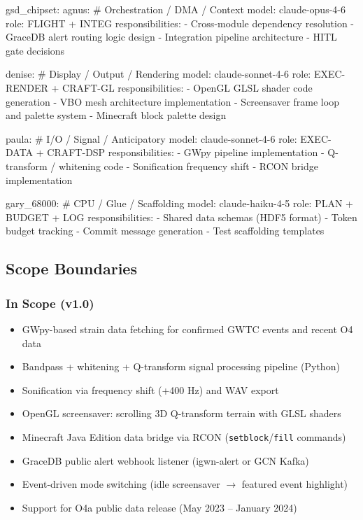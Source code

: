 \documentclass[11pt,letterpaper]{article}
\begin{document}
\begin{asciibox}
gsd_chipset:
  agnus:                        # Orchestration / DMA / Context
    model: claude-opus-4-6
    role: FLIGHT + INTEG
    responsibilities:
      - Cross-module dependency resolution
      - GraceDB alert routing logic design
      - Integration pipeline architecture
      - HITL gate decisions

  denise:                       # Display / Output / Rendering
    model: claude-sonnet-4-6
    role: EXEC-RENDER + CRAFT-GL
    responsibilities:
      - OpenGL GLSL shader code generation
      - VBO mesh architecture implementation
      - Screensaver frame loop and palette system
      - Minecraft block palette design

  paula:                        # I/O / Signal / Anticipatory
    model: claude-sonnet-4-6
    role: EXEC-DATA + CRAFT-DSP
    responsibilities:
      - GWpy pipeline implementation
      - Q-transform / whitening code
      - Sonification frequency shift
      - RCON bridge implementation

  gary_68000:                   # CPU / Glue / Scaffolding
    model: claude-haiku-4-5
    role: PLAN + BUDGET + LOG
    responsibilities:
      - Shared data schemas (HDF5 format)
      - Token budget tracking
      - Commit message generation
      - Test scaffolding templates
\end{asciibox}

\subsection{Scope Boundaries}

\subsubsection{In Scope (v1.0)}

\begin{itemize}[noitemsep]
  \item GWpy-based strain data fetching for confirmed GWTC events and recent O4 data
  \item Bandpass + whitening + Q-transform signal processing pipeline (Python)
  \item Sonification via frequency shift (+400 Hz) and WAV export
  \item OpenGL screensaver: scrolling 3D Q-transform terrain with GLSL shaders
  \item Minecraft Java Edition data bridge via RCON (\texttt{setblock}/\texttt{fill} commands)
  \item GraceDB public alert webhook listener (igwn-alert or GCN Kafka)
  \item Event-driven mode switching (idle screensaver $\rightarrow$ featured event highlight)
  \item Support for O4a public data release (May 2023 -- January 2024)
\end{itemize}
\end{document}
